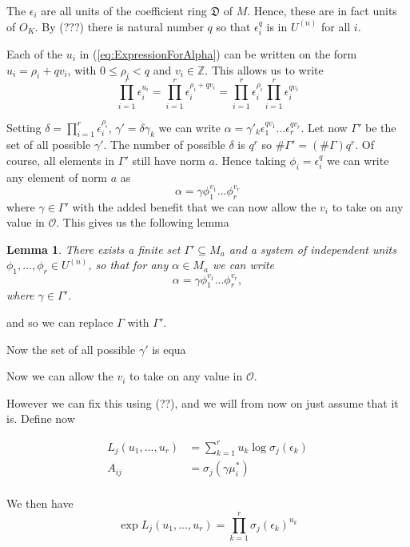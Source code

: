 \documentclass{article}
\newtheorem{lemma}{Lemma}[section]
\newcommand{\mfrak}[1]{\mathfrak{#1}}
\newcommand{\mcal}[1]{\mathcal{#1}}
\newcommand{\mbb}[1]{\mathbb{#1}}
\begin{document}
The $\epsilon_i$ are all units of the coefficient ring $\mfrak D$ of $M$. Hence, these are in fact units of $O_K$. By (???) there is natural number $q$ so that $\epsilon_i^q$ is in $U^{(n)}$ for all $i$. 


Each of the $u_i$ in (\ref{eq:ExpressionForAlpha}) can be written on the form $u_i = \rho_i + qv_i$, with $0 \leq \rho_i < q$ and $v_i \in \mbb{Z}$. This allows us to write 
$$\prod_{i=1}^r \epsilon_i^{u_i} = \prod_{i=1}^r \epsilon_i^{\rho_i + qv_i} = \prod_{i=1}^r \epsilon_i^{\rho_i} \prod_{i=1}^r \epsilon_i^{qv_i}$$ 

Setting $\delta = \prod_{i=1}^r \epsilon_i^{\rho_i}$, $\gamma' = \delta \gamma_k$ we can write $\alpha = \gamma'_k \epsilon_1^{qv_1}...\epsilon_r^{qv_r}$. Let now $\Gamma'$ be the set of all possible $\gamma'$. The number of possible $\delta$ is $q^r$ so $\# \Gamma' = (\# \Gamma) q^r$. Of course, all elements in $\Gamma'$ still have norm $a$. Hence taking $\phi_i = \epsilon_i^q$ we can write any element of norm $a$ as 
$$\alpha = \gamma \phi_1^{v_1}...\phi_r^{v_r}$$
where $\gamma \in \Gamma'$ with the added benefit that we can now allow the $v_i$ to take on any value in $\mcal O$.
This gives us the following lemma

\begin{lemma}
    There exists a finite set $\Gamma' \subseteq M_a$ and a system of independent units $\phi_1, ..., \phi_r \in U^{(n)}$, so that for any $\alpha \in M_a$ we can write $$\alpha = \gamma \phi_1^{v_1}...\phi_r^{v_r},$$ where $\gamma \in \Gamma'$.
\end{lemma}


and so we can replace $\Gamma$ with $\Gamma'$.


Now the set of all possible $\gamma'$ is equa


Now we can allow the $v_i$ to take on any value in $\mcal O$.



However we can fix this using (??), and we will from now on just assume that it is. Define now

\begin{align*}
    L_j(u_1, ..., u_r) &= \sum_{k = 1}^{r} u_k \log \sigma_j(\epsilon_k) \\
    A_{ij} &= \sigma_j(\gamma \mu_i^*) \\ 
\end{align*}

We then have 
$$\exp L_j (u_1, ..., u_r) = \prod_{k=1}^r \sigma_j(\epsilon_k)^{u_k}$$
\end{document}
